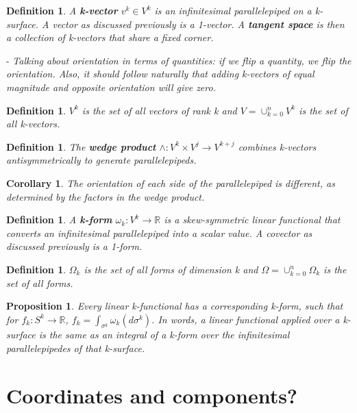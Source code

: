 \documentclass{book}
\newtheorem{defn}[equation]{Definition}
\newtheorem{coro}[equation]{Corollary}
\newtheorem{prop}[equation]{Proposition}
\begin{document}
\begin{defn}
	A \textbf{k-vector} $v^k \in V^k$ is an infinitesimal parallelepiped on a k-surface. A vector as discussed previously is a 1-vector. A \textbf{tangent space} is then a collection of k-vectors that share a fixed corner. 
\end{defn}

- \emph{Talking about orientation in terms of quantities: if we flip a quantity, we flip the orientation. Also, it should follow naturally that adding k-vectors of equal magnitude and opposite orientation will give zero.}



\begin{defn}
	$V^k$ is the set of all vectors of rank k and $V = \cup_{k=0}^n V^k$ is the set of all k-vectors. 
	\end{defn}



\begin{defn}
	
	The \textbf{wedge product} $\wedge : V^k\times V^j \to V^{k+j}$ combines k-vectors antisymmetrically to generate parallelepipeds. 
\end{defn}

\begin{coro}
	The orientation of each side of the parallelepiped is different, as determined by the factors in the wedge product. 
\end{coro}

\begin{defn}
	A \textbf{k-form} $\omega_k : V^k \to \mathbb{R}$ is a skew-symmetric linear functional that converts an infinitesimal parallelepiped into a scalar value. A covector as discussed previously is a 1-form. 
\end{defn}

\begin{defn}
	$\Omega_k$ is the set of all forms of dimension k and $\Omega = \cup_{k=0}^n\Omega_k$ is the set of all forms. 
\end{defn}

\begin{prop}
	Every linear k-functional has a corresponding k-form, such that for $f_k : S^k \to \mathbb{R}$, $f_k = \int_{\sigma^k} \omega_k(d\sigma^k)$. In words, a linear functional applied over a k-surface is the same as an integral of a k-form over the infinitesimal parallelepipedes of that k-surface. 
\end{prop}

\section{Coordinates and components?}
\end{document}
